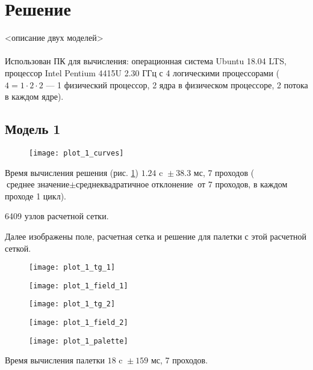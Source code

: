\section{Решение}

<описание двух моделей>
\\\\
Использован ПК для вычисления: операционная система Ubuntu 18.04 LTS, процессор Intel Pentium 4415U 2.30 ГГц с 4 логическими процессорами
($4 = 1 \cdot 2 \cdot 2$ --- 1 физический процессор, 2 ядра в физическом процессоре, 2 потока в каждом ядре).


\subsection{Модель 1}

\begin{figure}[H]
\texttt{[image: plot\_1\_curves]}
\caption{}
\label{fig:plot_1_curves}
\end{figure}

Время вычисления решения (рис. \ref{fig:plot_1_curves}) $1.24 \text{ c } \pm 38.3 \text{ мс}$, 7 проходов
($\text{среднее значение} \pm \text{среднеквадратичное отклонение}$ от 7 проходов, в каждом проходе 1 цикл).

6409 узлов расчетной сетки.

Далее изображены поле, расчетная сетка и решение для палетки с этой расчетной сеткой.

\begin{figure}[H]
\centering
\texttt{[image: plot\_1\_tg\_1]}
\caption{}
\end{figure}

\begin{figure}[H]
\centering
\texttt{[image: plot\_1\_field\_1]}
\caption{}
\end{figure}

\begin{figure}[H]
\texttt{[image: plot\_1\_tg\_2]}
\caption{}
\end{figure}

\begin{figure}[H]
\texttt{[image: plot\_1\_field\_2]}
\caption{}
\end{figure}

\begin{figure}[H]
\texttt{[image: plot\_1\_palette]}
\caption{}
\end{figure}

Время вычисления палетки $18 \text{ c } \pm 159 \text{ мс}$, 7 проходов.


